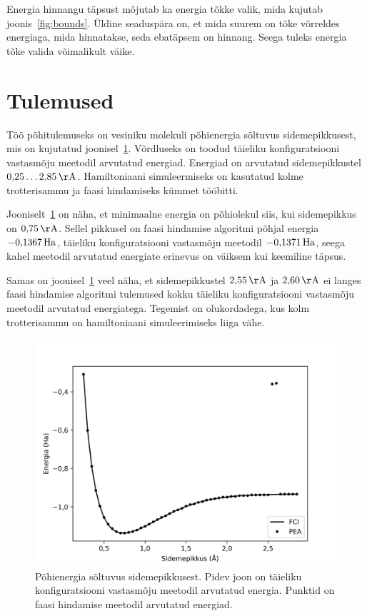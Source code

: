 \documentclass[12pt]{report}
\begin{document}
Energia hinnangu täpsust mõjutab ka energia tõkke valik, mida kujutab joonis~\ref{fig:bounds}.
Üldine seaduspära on, et mida suurem on tõke võrreldes energiaga, mida hinnatakse, seda ebatäpsem on hinnang.
Seega tuleks energia tõke valida võimalikult väike.

\section{Tulemused}

Töö põhitulemuseks on vesiniku molekuli põhienergia sõltuvus sidemepikkusest, mis on kujutatud joonisel~\ref{fig:scan}.
Võrdluseks on toodud täieliku konfiguratsiooni vastasmõju  meetodil arvutatud energiad.
Energiad on arvutatud sidemepikkustel \(0{,}25 \ldots 2{,}85\,{\rm Å}\).
Hamiltoniaani simuleermiseks on kasutatud kolme trotterisammu ja faasi hindamiseks kümmet tööbitti.

Jooniselt~\ref{fig:scan} on näha, et minimaalne energia on põhiolekul siis, kui sidemepikkus on \(0{,}75\,{\rm Å}\).
Sellel pikkusel on faasi hindamise algoritmi põhjal energia \(-0{,}1367\,{\rm Ha}\), täieliku konfiguratsiooni vastasmõju meetodil \(-0{,}1371\,{\rm Ha}\),
seega kahel meetodil arvutatud energiate erinevus on väiksem kui keemiline täpsus.

Samas on joonisel~\ref{fig:scan} veel näha, et sidemepikkustel \(2{,}55\,{\rm Å}\) ja \(2{,}60\,{\rm Å}\) ei langes faasi hindamise algoritmi tulemused kokku täieliku konfiguratsiooni vastasmõju meetodil arvutatud energiatega.
Tegemist on olukordadega, kus kolm trotterisammu on hamiltoniaani simuleerimiseks liiga vähe.

\begin{figure}[h]
  \centering
  \includegraphics[width=.65\hsize]{scan.jpg}
  \caption{Põhienergia sõltuvus sidemepikkusest. Pidev joon on täieliku konfiguratsiooni vastasmõju meetodil arvutatud energia. Punktid on faasi hindamise meetodil arvutatud energiad.}
  \label{fig:scan}
\end{figure}
\end{document}
